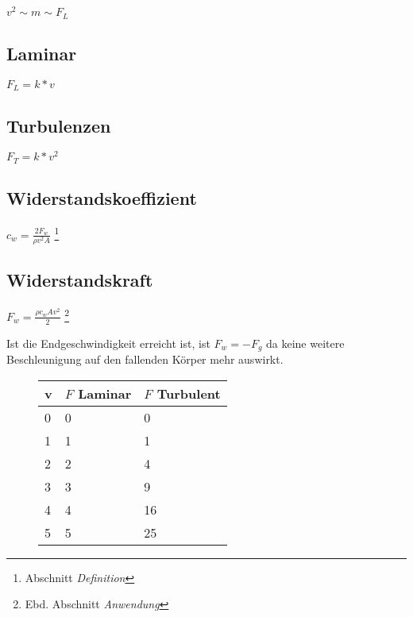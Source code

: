 \begin{multicols}{2}
	

\(v^2 \sim m \sim F_L\)

\subsection{Laminar}

\(F_L = k * v\)

\subsection{Turbulenzen}

\(F_T = k * v^2 \)

\subsection{\label{sec:widerst} Widerstandskoeffizient}

\( c_w = \frac{2F_w}{\rho v^2 A} \) \footnote{\cite{wikiwidkoef} Abschnitt \textit{Definition}}

\subsection{Widerstandskraft}

\(F_w = \frac{\rho c_w A v^2}{2} \) \footnote{Ebd. Abschnitt \textit{Anwendung}}

Ist die Endgeschwindigkeit erreicht ist, ist \(F_w = -F_g\) da keine weitere Beschleunigung auf den fallenden Körper mehr auswirkt.

\begin{figure}
	\centering
	\begin{tabular}{|l|l|l|}
		\hline
		\textbf{v} & \textbf{\(F\) Laminar} & \textbf{\(F\) Turbulent} \\
		\hline
		0 & 0 & 0\\ \hline
		1 & 1 & 1\\ \hline
		2 & 2 & 4\\ \hline
		3 & 3 & 9\\ \hline
		4 & 4 & 16\\ \hline
		5 & 5 & 25\\ \hline
		
	\end{tabular}
	\caption{\label{fig:tablegraph}}
\end{figure}

\end{multicols}
